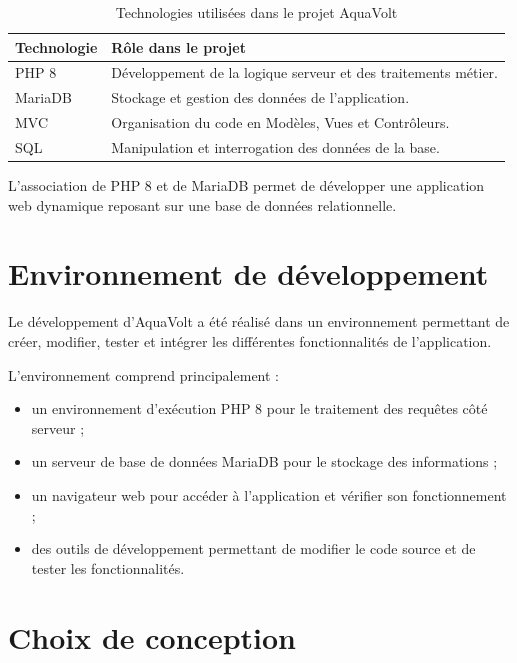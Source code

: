 \begin{table}[H]
    \centering
    \caption{Technologies utilisées dans le projet AquaVolt}
    \begin{tabularx}{\textwidth}{|l|X|}
        \hline
        \textbf{Technologie} & \textbf{Rôle dans le projet} \\
        \hline
        PHP 8 & Développement de la logique serveur et des traitements métier. \\
        \hline
        MariaDB & Stockage et gestion des données de l'application. \\
        \hline
        MVC & Organisation du code en Modèles, Vues et Contrôleurs. \\
        \hline
        SQL & Manipulation et interrogation des données de la base. \\
        \hline
    \end{tabularx}
\end{table}

L'association de PHP 8 et de MariaDB permet de développer une application web dynamique reposant sur une base de données relationnelle.

\section{Environnement de développement}

Le développement d'AquaVolt a été réalisé dans un environnement permettant de créer, modifier, tester et intégrer les différentes fonctionnalités de l'application.

L'environnement comprend principalement :

\begin{itemize}[leftmargin=*]
    \item un environnement d'exécution PHP 8 pour le traitement des requêtes côté serveur ;
    \item un serveur de base de données MariaDB pour le stockage des informations ;
    \item un navigateur web pour accéder à l'application et vérifier son fonctionnement ;
    \item des outils de développement permettant de modifier le code source et de tester les fonctionnalités.
\end{itemize}

\section{Choix de conception}

